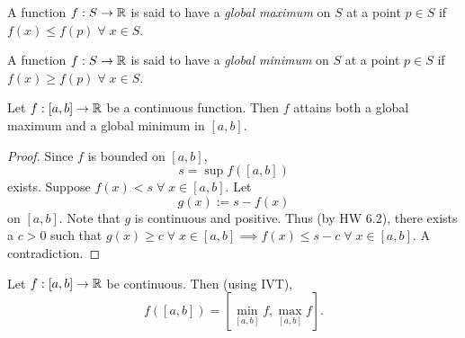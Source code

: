 
\begin{defn} \label{defn:cont:global_extrema}
    A function $f : S \to \mathbb{R}$ is said to have a \emph{global maximum} on $S$ at a point $p \in S$ if $f(x) \leq f(p) \;\forall\; x \in S$.

    A function $f : S \to \mathbb{R}$ is said to have a \emph{global minimum} on $S$ at a point $p \in S$ if $f(x) \geq f(p) \;\forall\; x \in S$.
\end{defn}

\begin{thm} \label{thm:cont:EVT}
    Let $f : [a, b] \to \mathbb{R}$ be a continuous function. Then $f$ attains both a global maximum and a global minimum in $[a, b]$.
\end{thm}
\begin{proof}
    Since $f$ is bounded on $[a, b]$, \[
        s = \sup f([a, b])
    \] exists.
    Suppose $f(x) < s \;\forall\; x \in [a, b]$. Let \[
        g(x) := s - f(x)
    \] on $[a, b]$.
    Note that $g$ is continuous and positive.
    Thus (by \textcolor{exercise}{HW 6.2}), there exists a $c > 0$ such that $g(x) \geq c \;\forall\; x \in [a, b] \implies f(x) \leq s - c \;\forall\; x \in [a, b]$.
    A contradiction.
\end{proof}
\begin{cor} \label{thm:cont:EVT:compact->compact}
    Let $f : [a, b] \to \mathbb{R}$ be continuous.
    Then (using IVT), \[
        f([a, b]) = [\min_{[a, b]} f, \max_{[a, b]} f].
    \]
\end{cor}
